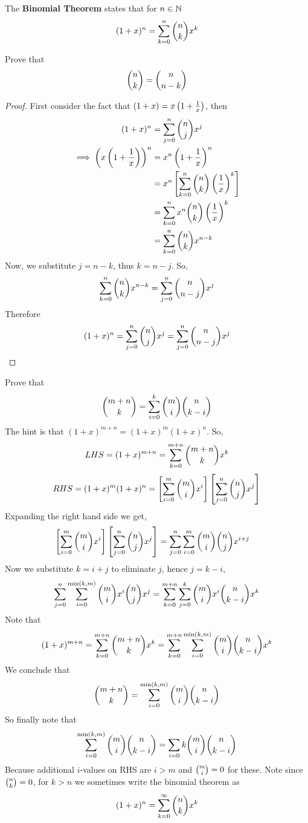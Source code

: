 \documentclass[english, 11pt]{article}
\begin{document}
\begin{defn}\label{binomialtheorem}
  The \textbf{Binomial Theorem} states that for $n \in {\mathbb{N}}$
  \[ (1+x)^n = \sum_{k=0}^n {n \choose k}x^k \]
\end{defn}

\begin{exmp}
  Prove that
  \[ {n \choose k} = {n \choose n-k} \]
\end{exmp}
\begin{proof}
 First consider the fact that $(1+x) = x\left(1+\frac{1}{x}\right)$, then
 \begin{align*}
   (1+x)^n & = \sum_{j=0}^n {n \choose j} x^j \\
   \implies \left(x\left(1 + \frac{1}{x}\right)\right)^n & = x^n\left(1+\frac{1}{x}\right)^n \\
   & = x^n \left[ \sum_{k=0}^n {n \choose k} \left(\frac{1}{x}\right)^k\right] \\
   & =  \sum_{k=0}^n x^n {n \choose k} \left(\frac{1}{x}\right)^k \\
   & = \sum_{k=0}^n {n \choose k} x^{n-k}
 \end{align*}
 Now, we substitute $j = n - k$, thus $k = n - j$. So,
\[ \sum_{k=0}^n {n \choose k} x^{n-k} = \sum_{j=0}^n {n \choose n-j}x^j \]
Therefore
\[ (1+x)^n = \sum_{j=0}^n {n \choose j} x^j = \sum_{j=0}^n {n \choose n-j} x^j\]
\end{proof}

\begin{exmp}
  Prove that
  \[ {m+n \choose k} = \sum_{i=0}^k {m \choose i} {n \choose k-i} \]
  The hint is that $(1+x)^{m+n} = (1+x)^m(1+x)^n$. So,
  \[ LHS = (1+x)^{m+n} = \sum_{k = 0}^{m+n} {m+n \choose k}x^k \]
  \[ RHS = (1+x)^m(1+x)^n = \left[\sum_{i=0}^m{m \choose i}x^i\right]\left[\sum_{j=0}^n{n \choose j}x^j\right] \]
  Expanding the right hand side we get,
  \begin{align*}
    \left[\sum_{i=0}^m{m \choose i}x^i\right]\left[\sum_{j=0}^n{n \choose j}x^j\right] & = \sum_{j=0}^n\sum_{i=0}^m {m \choose i} {n \choose j}x^{i+j}
  \end{align*}
  Now we substitute $k = i + j$ to eliminate $j$, hence $j = k - i$,
  \[ \sum_{j=0}^{n}\sum_{i=0}^{\min(k,m)} {m \choose i}x^i {n \choose j}x^j  = \sum_{k=0}^{m+n}\sum_{j=0}^{k} {m \choose i}x^i {n \choose k-i}x^{k} \]
  Note that
  \[ (1+x)^{m+n} = \sum_{k=0}^{m+n} {m+n \choose k} x^k = \sum_{k=0}^{m+n} \sum_{i=0}^{\min(k,m)} {m \choose i}{n \choose k-i}x^k \]
  We conclude that
  \[ {m+n \choose k} = \sum_{i=0}^{\min(k,m)}{m \choose i}{n \choose k-i} \]
  So finally note that
  \[ \sum_{i=0}^{\min(k,m)} {m \choose i} {n \choose k-i} = \sum_{i=0}{k}{m \choose i}{n \choose k-i} \]
  Because additional $i$-values on RHS are $i > m$ and ${m \choose i} = 0$ for these. Note since ${n \choose k} = 0$, for $k > n$ we sometimes write the binomial theorem as
  \[ (1+x)^n = \sum_{k=0}^{\infty}{n \choose k}x^k \]
\end{exmp}
\end{document}
